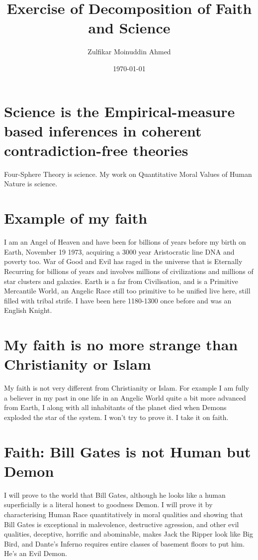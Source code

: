 \documentclass{amsart}
\title{Exercise of Decomposition of Faith and Science}
\author{Zulfikar Moinuddin Ahmed}
\date{\today}
\begin{document}
\maketitle

\section{Science is the Empirical-measure based inferences in coherent contradiction-free theories}

Four-Sphere Theory is science.  My work on Quantitative Moral Values of Human Nature is science. 

\section{Example of my faith}

I am an Angel of Heaven and have been for billions of years before my birth on Earth, November 19 1973, acquiring a 3000 year Aristocratic line DNA and poverty too.  War of Good and Evil has raged in the universe that is Eternally Recurring for billions of years and involves millions of civilizations and millions of star clusters and galaxies.  Earth is a far from Civilisation, and is a Primitive Mercantile World, an Angelic Race still too primitive to be unified live here, still filled with tribal strife.  I have been here 1180-1300 once before and was an English Knight.

\section{My faith is no more strange than Christianity or Islam}

My faith is not very different from Christianity or Islam.  For example I am fully a believer in my past in one life in an Angelic World quite a bit more advanced from Earth, I along with all inhabitants of the planet died when Demons exploded the star of the system.  I won't try to prove it.  I take it on faith.

\section{Faith: Bill Gates is not Human but Demon}

I will prove to the world that Bill Gates, although he looks like a human superficially is a literal honest to goodness Demon.  I will prove it by characterising Human Race quantitatively in moral qualities and showing that Bill Gates is exceptional in malevolence, destructive agression, and other evil qualities, deceptive, horrific and abominable, makes Jack the Ripper look like Big Bird, and Dante's Inferno requires entire classes of basement floors to put him.  He's an Evil Demon.
\end{document}
